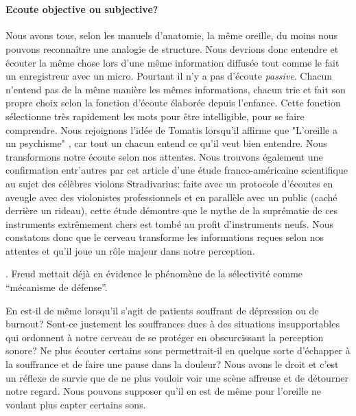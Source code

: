\







\paragraph{Ecoute objective ou subjective?}

Nous avons tous,
selon les manuels d'anatomie, la même
oreille, du moins nous pouvons reconnaître une analogie de structure. Nous devrions donc entendre et écouter la même chose
lors d'une même information diffusée tout comme le fait un enregistreur avec un micro. Pourtant il n'y a pas d'écoute \emph{passive}. Chacun n'entend pas de la même manière les mêmes
informations, chacun trie et fait son propre choix selon la fonction
d'écoute élaborée depuis l'enfance. Cette fonction sélectionne très
rapidement les mots pour être intelligible, pour se faire
comprendre. Nous rejoignons l'idée de Tomatis lorsqu'il affirme que
"L'oreille a un psychisme" , car tout un chacun entend ce qu'il veut bien
entendre. \autocite{tomatis_oreille_1998} 
Nous transformons notre écoute selon nos attentes. Nous trouvons
également une confirmation entr'autres par cet 
article d'une 
étude franco-américaine scientifique
\autocite{fritz_stradivarius} au sujet des célèbres violons
Stradivarius: faite avec un protocole 
d'écoutes en aveugle avec
des violonistes professionnels et en parallèle avec un public (caché
derrière un rideau), cette étude démontre que le mythe de la suprématie
de ces instruments extrêmement chers est tombé au profit d'instruments
neufs. Nous constatons donc que le cerveau 
transforme les informations reçues selon nos attentes et qu'il joue un
rôle majeur dans notre perception.

\autocite{lemonde.fr:stradivarius}.
% 
\autocite[p. 43]{roque:lecoute}
 Freud mettait déjà en évidence le phénomène de la
sélectivité comme ``mécanisme de défense''. \autocite{S.Freud,
  Psychologie de la vie quotidienne, 1904}

En est-il de même lorsqu'il s'agit de patients souffrant de dépression
ou de burnout? Sont-ce justement les souffrances dues à des situations
insupportables qui
ordonnent à notre cerveau de se protéger en obscurcissant la
perception sonore?  Ne plus écouter certains
sons permettrait-il en quelque sorte d'échapper à la souffrance et de faire une
pause dans la douleur? Nous avons le droit et c'est un réflexe de
survie que de ne plus vouloir voir une scène affreuse et de détourner
notre regard. Nous pouvons supposer qu'il en est de même pour l'oreille ne voulant plus capter
certains sons.


